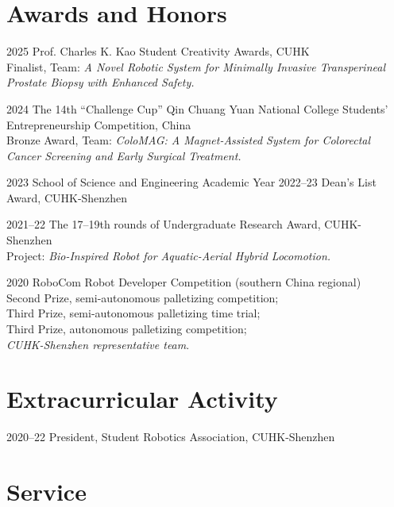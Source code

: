 \documentclass[11pt,letterpaper]{report}
\begin{document}
		
\section*{Awards and Honors}
\begin{tablist}	
	\item[2025] \tab Prof. Charles K. Kao Student Creativity Awards, CUHK\\
	Finalist, Team: \textit{A Novel Robotic System for Minimally Invasive Transperineal Prostate Biopsy with Enhanced Safety.}
	
	\item[2024] \tab The 14th ``Challenge Cup'' Qin Chuang Yuan National College Students' Entrepreneurship Competition, China\\
	Bronze Award, Team: \textit{ColoMAG: A Magnet-Assisted System for Colorectal Cancer Screening and Early Surgical Treatment.}	

	\item[2023]   \tab School of Science and Engineering Academic Year 2022--23 Dean's List Award, CUHK-Shenzhen
	
	\item[2021--22]   \tab The 17--19th rounds of  Undergraduate Research Award, CUHK-Shenzhen\\
	Project: \textit{Bio-Inspired Robot for Aquatic-Aerial Hybrid Locomotion.}
	
	\item[2020] \tab RoboCom Robot Developer Competition (southern China regional)\\
	{Second Prize, semi-autonomous palletizing competition};\\
	{Third Prize, semi-autonomous palletizing time trial};\\
	{Third Prize, autonomous palletizing competition};\\
	\textit{CUHK-Shenzhen representative team}.
\end{tablist}

\section*{Extracurricular Activity}
\begin{tablist}
	\item[2020--22]   \tab President, Student Robotics Association, CUHK-Shenzhen 
\end{tablist}

\section*{Service}
\end{document}
